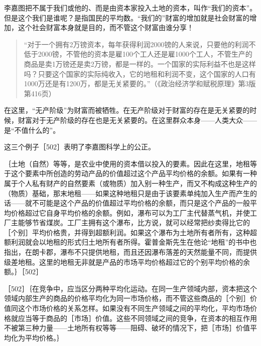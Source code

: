 李嘉图把不属于我们或他的、而是由资本家投入土地的资本，叫作“我们的资本”。但是这个我们是谁呢？是指国民的平均数。“我们的”财富的增加就是社会财富的增加，这个社会财富本身就是目的，而不管这个财富由谁分享！

\begin{quote}{“对于一个拥有2万镑资本，每年获得利润2000镑的人来说，只要他的利润不低于2000镑，不管他的资本是雇100个工人还是雇1000个工人，不管生产的商品是卖1万镑还是卖2万镑，都是一样的。一个国家的实际利益不也是这样吗？只要这个国家的实际纯收入，它的地租和利润不变，这个国家的人口有1000万还是有1200万，都是无关紧要的。”（《政治经济学和赋税原理》第3版第416页）}\end{quote}

在这里，“无产阶级”为财富而被牺牲。在无产阶级对于财富的存在是无关紧要的时候，财富对于无产阶级的存在也是无关紧要的。在这里群众本身——人类大众——是“不值什么的”。

这三个例子［502］表明了李嘉图科学上的公正。


｛土地（自然）等等，是农业中使用的资本借以投入的要素。因此在这里，地租等于这个要素中所创造的劳动产品的价值超过这个产品平均价格的余额。如果有一种属于个人私有财产的自然要素（或物质）加入别一种生产，而又不构成这种生产的（物质）基础，那末地租——如果这种地租只是由于该要素单纯加入生产而产生的话——就不可能是这个产品的价值超过平均价格的余额，而只是这个产品的一般平均价格超过它自身平均价格的余额。例如，瀑布可以为工厂主代替蒸气机，并使工厂主能够节省煤炭。工厂主拥有这个瀑布，比方说，就可以经常把纱卖得比它的［个别］平均价格贵，并得到超额利润。如果这个瀑布为土地所有者所有，这种超额利润就会以地租的形式归土地所有者所得。霍普金斯先生在他论“地租”的书中也指出，在朗卡郡，瀑布不只提供地租，而且还因瀑布落差的天然能量不同，而提供级差地租。这里的地租无非就是产品的市场平均价格超过它的个别平均价格的余额。｝［502］


［502］｛在竞争中，应当区分两种平均化运动。在同一生产领域内部，资本把这个领域内部生产的商品的价格平均化为同一市场价格，而不管这些商品的［个别］价值同这个市场价格的关系怎样。如果没有不同生产领域之间的平均化，平均市场价格就应当等于商品的［市场］价值。这些不同领域之间的竞争，在资本的相互作用不被第三种力量——土地所有权等等——阻碍、破坏的情况下，把［市场］价值平均化为平均价格。｝


